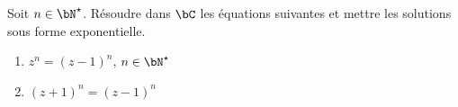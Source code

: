
\begin{exercice}  \;
Soit $n\in\bN^{\star}$. R\'esoudre dans $\bC$ les \'equations suivantes et mettre les solutions sous forme exponentielle.
\begin{enumerate}
\item $z^n=(z-1)^n$, $n\in\bN^{\star}$
\item $(z+1)^n=(z-1)^n$ 
\end{enumerate}
\end{exercice}